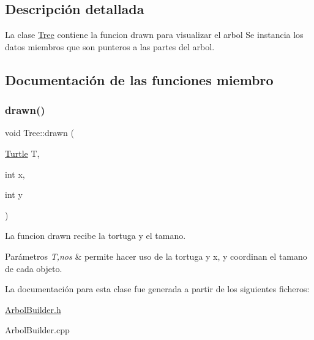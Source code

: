\subsection{Descripción detallada}
La clase \hyperlink{classTree}{Tree} contiene la funcion drawn para visualizar el arbol  Se instancia los datos miembros que son punteros a las partes del arbol. 

\subsection{Documentación de las funciones miembro}
\mbox{\label{classTree_aeb680a32bf1743d52cf63da53712dc7d}} 
\subsubsection{\texorpdfstring{drawn()}{drawn()}}
{\footnotesize\ttfamily void Tree\+::drawn (\begin{DoxyParamCaption}\item[{\hyperlink{classTurtle}{Turtle}}]{T,  }\item[{int}]{x,  }\item[{int}]{y }\end{DoxyParamCaption})}

La funcion drawn recibe la tortuga y el tamano. 
\begin{DoxyParams}{Parámetros}
{\em T,nos} & permite hacer uso de la tortuga y x, y coordinan el tamano de cada objeto. \\
\hline
\end{DoxyParams}


La documentación para esta clase fue generada a partir de los siguientes ficheros\+:\begin{DoxyCompactItemize}
\item 
\hyperlink{ArbolBuilder_8h}{Arbol\+Builder.\+h}\item 
Arbol\+Builder.\+cpp\end{DoxyCompactItemize}
